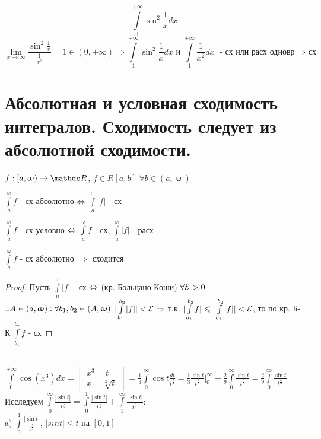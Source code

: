 \documentclass[12pt, fleqn]{article}
\begin{document}
\begin{Property}[3]
\begin{Property}[4]
\begin{Property}[2, аддитивность]
\begin{Proof}
\begin{Example}
    \[\int\limits_1^{+\infty} \sin^2 \frac{1}{x} dx\]
    \[\lim\limits_{x\rightarrow\infty} \frac{\sin^2 \frac{1}{x}}{\frac{1}{x^2}} = 1 \in (0,+\infty) \Rightarrow \int\limits_1^{+\infty} \sin^2 \frac{1}{x} dx \text{ и } \int\limits_1^{+\infty} \frac{1}{x^2} dx \text{ - сх или расх одновр $\Rightarrow$ сх}\]
\end{Example}

\newpage
\section{Абсолютная и условная сходимость интегралов. Сходимость следует из абсолютной сходимости.}

\begin{definition}
    $f: [a, \upomega) \rightarrow \R$, $f \in R[a,b]$ $\forall b \in (a, \upomega)$
    
    $\int\limits_a^\upomega f$ - сх абсолютно $\Leftrightarrow$ $\int\limits_a^\upomega |f|$ - сх
    
    $\int\limits_a^\upomega f$ - сх условно $\Leftrightarrow$ $\int\limits_a^\upomega f$ - сх, $\int\limits_a^\upomega |f|$ - расх
\end{definition}

\begin{utv}
    $\int\limits_a^\upomega f$ - сх абсолютно $\Rightarrow$ сходится
\end{utv}

\begin{proof}
    Пусть $\int\limits_a^\upomega |f|$ - сх $\Leftrightarrow$ (кр. Больцано-Коши) $\forall \mathcal{E} > 0$ $\exists A \in (a, \upomega): \forall b_1, b_2 \in (A, \upomega)$ $|\int\limits_{b_1}^{b_2} |f|| < \mathcal{E} \Rightarrow $ т.к. $|\int\limits_{b_1}^{b_2} f| \leqslant |\int\limits_{b_1}^{b_2} |f|| < \mathcal{E}$, то по кр. Б-К $\int\limits_{b_1}^{b_2} f$ - сх
\end{proof}

\begin{example} \ \\
    $\int\limits_0^{+\infty} \cos (x^3) dx = \begin{vmatrix}
      x^3 = t\\
      x = \sqrt[3]{t}
    \end{vmatrix} = \frac{1}{3} \int\limits_0^\infty \cos t \frac{dt}{t^{\frac{2}{3}}} = \frac{1}{3} \frac{\sin t}{t^{\frac{2}{3}}}|_0^\infty + \frac{2}{9} \int\limits_0^\infty \frac{\sin t}{t^{\frac{5}{3}}} = \frac{2}{9} \int\limits_0^\infty \frac{\sin t}{t^{\frac{5}{3}}}$\\
    Исследуем $\int\limits_0^\infty \frac{|\sin t|}{t^{\frac{5}{3}}} = \int\limits_0^1 \frac{|\sin t|}{t^{\frac{5}{3}}} + \int\limits_1^\infty \frac{|\sin t|}{t^{\frac{5}{3}}}$:
    \\
    a) $\int\limits_0^1 \frac{|\sin t|}{t^{\frac{5}{3}}}$, $|sin t| \leqslant t$ на $[0,1]$
    

\end{example}
\end{Proof}
\end{Property}
\end{Property}
\end{Property}
\end{document}
